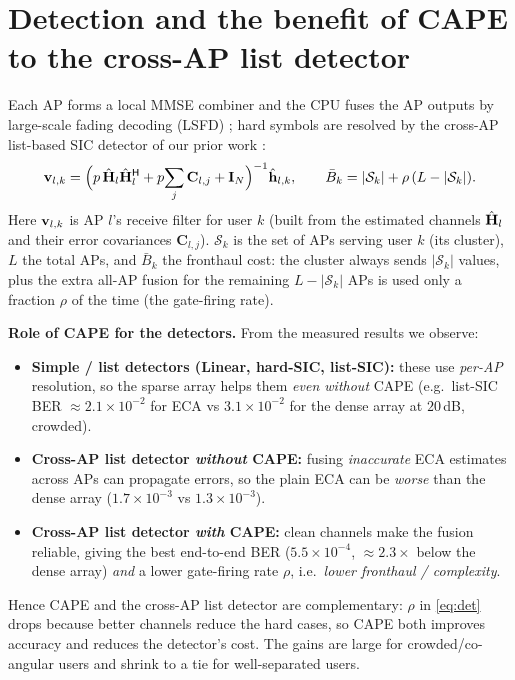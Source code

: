 \documentclass[11pt]{article}
\newcommand{\herm}{^{\mathsf{H}}}
\newcommand{\mC}{\mathbf{C}}\newcommand{\mI}{\mathbf{I}}\newcommand{\mR}{\mathbf{R}}
\begin{document}
\section{Detection and the benefit of CAPE to the cross-AP list detector}
Each AP forms a local MMSE combiner and the CPU fuses the AP outputs by large-scale fading decoding
(LSFD) \cite{bjornson2020scalable}; hard symbols are resolved by the cross-AP list-based SIC detector
of our prior work \cite{haider2026icassp,haider2026vtc}:
\begin{equation}
\vv_{l,k}=\Big(p\,\hat{\mH}_{l}\hat{\mH}_{l}\herm+p\!\sum_{j}\mC_{l,j}+\mI_{N}\Big)^{-1}\hat{\vh}_{l,k},
\qquad
\bar B_{k}=|\mathcal S_{k}|+\rho\,(L-|\mathcal S_{k}|).
\label{eq:det}
\end{equation}
%
{Here $\mathbf{v}_{l,k}$ is AP $l$'s receive filter for user $k$ (built from the estimated channels
$\hat{\mathbf{H}}_{l}$ and their error covariances $\mC_{l,j}$). $\mathcal S_{k}$ is the set of APs serving
user $k$ (its cluster), $L$ the total APs, and $\bar B_{k}$ the fronthaul cost: the cluster always
sends $|\mathcal S_{k}|$ values, plus the extra all-AP fusion for the remaining $L-|\mathcal S_{k}|$
APs is used only a fraction $\rho$ of the time (the gate-firing rate).}

\noindent\textbf{Role of CAPE for the detectors.} From the measured results we observe:
\begin{itemize}[leftmargin=1.4em,itemsep=1pt]
\item \textbf{Simple / list detectors (Linear, hard-SIC, list-SIC):} these use \emph{per-AP}
      resolution, so the sparse array helps them \emph{even without} CAPE (e.g.\ list-SIC BER $\approx
      2.1\times10^{-2}$ for ECA vs $3.1\times10^{-2}$ for the dense array at $20$\,dB, crowded).
\item \textbf{Cross-AP list detector \emph{without} CAPE:} fusing \emph{inaccurate} ECA estimates
      across APs can propagate errors, so the plain ECA can be \emph{worse} than the dense array
      ($1.7\times10^{-3}$ vs $1.3\times10^{-3}$).
\item \textbf{Cross-AP list detector \emph{with} CAPE:} clean channels make the fusion reliable,
      giving the best end-to-end BER ($5.5\times10^{-4}$, $\approx2.3\times$ below the dense array)
      \emph{and} a lower gate-firing rate $\rho$, i.e.\ \emph{lower fronthaul / complexity}.
\end{itemize}
Hence CAPE and the cross-AP list detector are complementary: $\rho$ in \eqref{eq:det} drops because
better channels reduce the hard cases, so CAPE both improves accuracy and reduces the detector's
cost. The gains are large for crowded/co-angular users and shrink to a tie for well-separated users.



\end{document}
